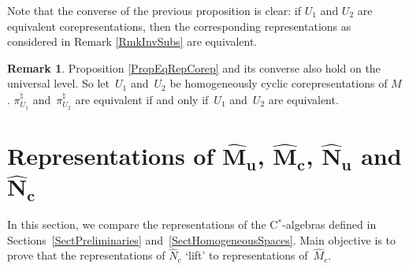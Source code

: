 \documentclass[11pt]{article}
\numberwithin{equation}{section}
\theoremstyle{definition}
\newtheorem{rmk}[thm]{Remark}
\begin{document}
Note that the converse of the previous proposition is clear: if $U_1$ and $U_2$ are equivalent corepresentations, then the corresponding representations as considered in Remark \ref{RmkInvSubs} are equivalent.

\begin{rmk}\label{RmkAlsoUniv}
Proposition \ref{PropEqRepCorep} and its converse also hold on the universal level. So let~$U_1$ and~$U_2$ be homogeneously cyclic corepresentations of $M$. $\pi_{U_1}^\natural$ and~$\pi_{U_2}^\natural$
 are equivalent if and only if~$U_1$ and~$U_2$ are equivalent.
\end{rmk}



\section[Representations of $\hat{M}_u$, $\hat{M}_c$, $\hat{N}_u$ and $\hat{N}_c$]{Representations of $\boldsymbol{\hat{M}_u}$, $\boldsymbol{\hat{M}_c}$, $\boldsymbol{\hat{N}_u}$ and $\boldsymbol{\hat{N}_c}$}\label{SectCorrespondence}

In this section, we compare the representations of the C$^\ast$-algebras def\/ined in Sections~\ref{SectPreliminaries} and~\ref{SectHomogeneousSpaces}. Main objective is to prove that the representations of $\hat{N}_c$ `lift' to representations of~$\hat{M}_c$.
\end{document}
